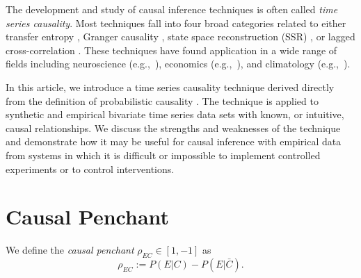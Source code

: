 \documentclass[twocolumn,aps,pre,groupedaddress]{revtex4-1}
\begin{document}
The development and study of causal inference techniques is often called {\em time series causality}.  Most techniques fall into four broad categories related to either transfer entropy \cite{Schreiber2000}, Granger causality \cite{granger1969}, state space reconstruction (SSR) \cite{Sugihara2012}, or lagged cross-correlation \cite{box2013,pascual2014}.  These techniques have found application in a wide range of fields including neuroscience (e.g.,\ \cite{Kaminski2001}), economics (e.g.,\ \cite{dufour1998,dufour2006}), and climatology (e.g.,\ \cite{mosedale2006}).  

In this article, we introduce a time series causality technique derived directly from the definition of probabilistic causality \cite{Suppes1970}.  The technique is applied to synthetic and  empirical bivariate time series data sets with known, or intuitive, causal relationships.  We discuss the strengths and weaknesses of the technique and demonstrate how it may be useful for causal inference with empirical data from systems in which it is difficult or impossible to implement controlled experiments or to control interventions.  

\section{Causal Penchant}
We define the {\em causal penchant} $\rho_{EC}\in\left[1,-1\right]$ as
\begin{equation}
\label{eq:pen}
\rho_{EC} := P\left(E|C\right) - P\left(E|\bar{C}\right).
\end{equation}
\end{document}
